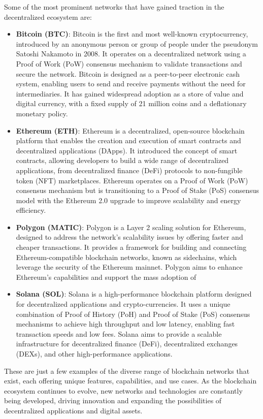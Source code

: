 Some of the most prominent networks that have gained traction in the decentralized ecosystem are:
\begin{itemize}
    \item \textbf{Bitcoin (BTC)}: Bitcoin is the first and most well-known cryptocurrency, introduced by an anonymous person or group of people under the pseudonym Satoshi Nakamoto in 2008. It operates on a decentralized network using a Proof of Work (PoW) consensus mechanism to validate transactions and secure the network. Bitcoin is designed as a peer-to-peer electronic cash system, enabling users to send and receive payments without the need for intermediaries. It has gained widespread adoption as a store of value and digital currency, with a fixed supply of 21 million coins and a deflationary monetary policy.
    \item \textbf{Ethereum (ETH)}: Ethereum is a decentralized, open-source blockchain platform that enables the creation and execution of smart contracts and decentralized applications (DApps). It introduced the concept of smart contracts, allowing developers to build a wide range of decentralized applications, from decentralized finance (DeFi) protocols to non-fungible token (NFT) marketplaces. Ethereum operates on a Proof of Work (PoW) consensus mechanism but is transitioning to a Proof of Stake (PoS) consensus model with the Ethereum 2.0 upgrade to improve scalability and energy efficiency.
    \item \textbf{Polygon (MATIC)}: Polygon is a Layer 2 scaling solution for Ethereum, designed to address the network's scalability issues by offering faster and cheaper transactions. It provides a framework for building and connecting Ethereum-compatible blockchain networks, known as sidechains, which leverage the security of the Ethereum mainnet. Polygon aims to enhance Ethereum's capabilities and support the mass adoption of
    \item \textbf{Solana (SOL)}: Solana is a high-performance blockchain platform designed for decentralized applications and crypto-currencies. It uses a unique combination of Proof of History (PoH) and Proof of Stake (PoS) consensus mechanisms to achieve high throughput and low latency, enabling fast transaction speeds and low fees. Solana aims to provide a scalable infrastructure for decentralized finance (DeFi), decentralized exchanges (DEXs), and other high-performance applications.
\end{itemize}

These are just a few examples of the diverse range of blockchain networks that exist, each offering unique features, capabilities, and use cases. As the blockchain ecosystem continues to evolve, new networks and technologies are constantly being developed, driving innovation and expanding the possibilities of decentralized applications and digital assets.

